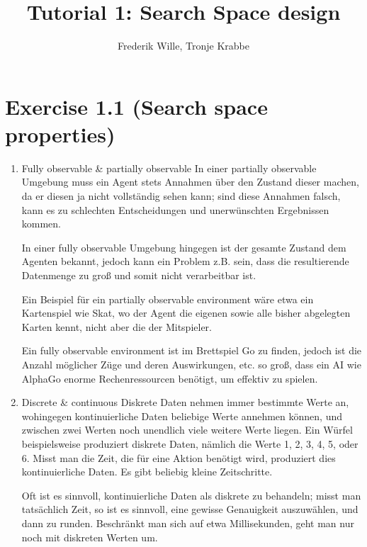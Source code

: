 \documentclass[12pt,a4paper]{article}
\author{Frederik Wille, Tronje Krabbe}
\title{Tutorial 1: Search Space design}
\begin{document}
\maketitle


\section*{Exercise 1.1 (Search space properties)}
\begin{enumerate}
    \item Fully observable \& partially observable
        In einer partially observable Umgebung muss ein Agent stets Annahmen
        über den Zustand dieser machen, da er diesen ja nicht vollständig sehen kann;
        sind diese Annahmen falsch, kann es zu schlechten Entscheidungen
        und unerwünschten Ergebnissen kommen.

        In einer fully observable Umgebung hingegen ist der gesamte Zustand dem Agenten
        bekannt, jedoch kann ein Problem z.B. sein, dass die resultierende Datenmenge
        zu groß und somit nicht verarbeitbar ist.

        Ein Beispiel für ein partially observable environment wäre etwa ein Kartenspiel
        wie Skat, wo der Agent die eigenen sowie alle bisher abgelegten Karten
        kennt, nicht aber die der Mitspieler.

        Ein fully observable environment ist im Brettspiel Go zu finden, jedoch
        ist die Anzahl möglicher Züge und deren Auswirkungen, etc. so groß,
        dass ein AI wie AlphaGo enorme Rechenressourcen benötigt, um effektiv zu spielen.

    \item Discrete \& continuous
        Diskrete Daten nehmen immer bestimmte Werte an, wohingegen kontinuierliche
        Daten beliebige Werte annehmen können, und zwischen zwei Werten noch unendlich
        viele weitere Werte liegen. Ein Würfel beispielsweise produziert diskrete Daten,
        nämlich die Werte 1, 2, 3, 4, 5, oder 6. Misst man die Zeit, die für eine Aktion
        benötigt wird, produziert dies kontinuierliche Daten. Es gibt beliebig kleine
        Zeitschritte.

        Oft ist es sinnvoll, kontinuierliche Daten als diskrete zu behandeln; misst man
        tatsächlich Zeit, so ist es sinnvoll, eine gewisse Genauigkeit auszuwählen,
        und dann zu runden. Beschränkt man sich auf etwa Millisekunden, geht man nur noch
        mit diskreten Werten um.


\end{enumerate}
\end{document}
